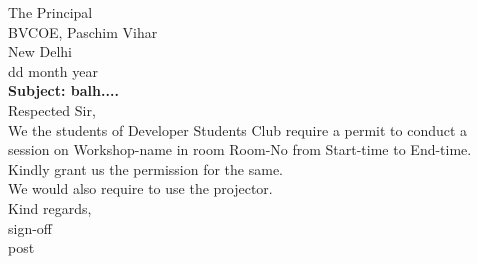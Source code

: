 \documentclass[12pt,a4paper]{article} %
\begin{document}
	

	\hspace{-8mm}
	The Principal \\
	BVCOE, Paschim Vihar\\
	New Delhi\\
	\linebreak
	dd month year\\
	\linebreak
	\textbf{Subject: balh....}\\
	\linebreak
	Respected Sir,\\
	
	\vspace{-5mm}
	\hspace{8mm}
	We the students of Developer Students Club require a permit to conduct a session on 
	Workshop-name 
	in room
	Room-No
	from 
	Start-time 
	to 
	End-time.\\
	Kindly grant us the permission for the same. \\
	We would also require to use the projector.\\
	\linebreak
	Kind regards,\\
	sign-off\\
	post 
	
\end{document}
